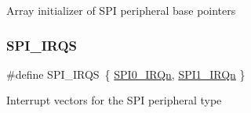 Array initializer of S\+PI peripheral base pointers \mbox{\label{group___s_p_i___peripheral___access___layer_ga30fd955e8b934f6ea091b7476a020d59}} 
\subsubsection{\texorpdfstring{SPI\_IRQS}{SPI\_IRQS}}
{\footnotesize\ttfamily \#define S\+P\+I\+\_\+\+I\+R\+QS~\{ \mbox{\hyperlink{group___interrupt__vector__numbers_gga666eb0caeb12ec0e281415592ae89083afa7f89ab9f5d1965ea1599578d01a454}{S\+P\+I0\+\_\+\+I\+R\+Qn}}, \mbox{\hyperlink{group___interrupt__vector__numbers_gga666eb0caeb12ec0e281415592ae89083aacdff1a9c42582ed663214cbe62c1174}{S\+P\+I1\+\_\+\+I\+R\+Qn}} \}}

Interrupt vectors for the S\+PI peripheral type 
